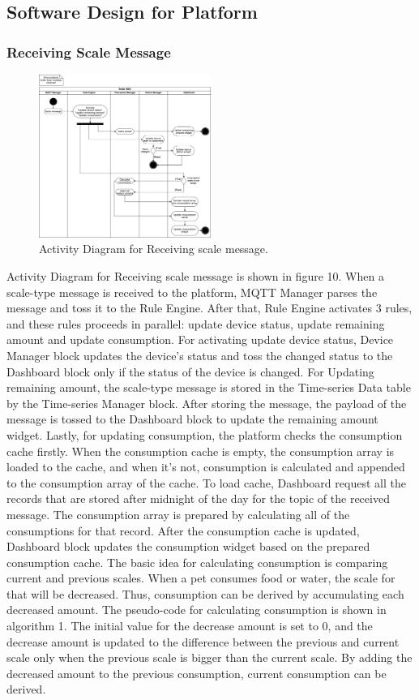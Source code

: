 \documentclass[conference]{IEEEtran}
\begin{document}
\subsection{Software Design for Platform}
\subsubsection{Receiving Scale Message}
\begin{figure}[htbp]
\centerline{\includegraphics[width=0.5\textwidth]{./images/scaleMessageReceived.png}}
\caption{Activity Diagram for Receiving scale message.}
\label{fig}
\end{figure}

Activity Diagram for Receiving scale message is shown in figure 10. When a scale-type message is received to the platform, MQTT Manager parses the message and toss it to the Rule Engine. After that, Rule Engine activates 3 rules, and these rules proceeds in parallel: update device status, update remaining amount and update consumption. For activating update device status, Device Manager block updates the device’s status and toss the changed status to the Dashboard block only if the status of the device is changed. For Updating remaining amount, the scale-type message is stored in the Time-series Data table by the Time-series Manager block. After storing the message, the payload of the message is tossed to the Dashboard block to update the remaining amount widget.
Lastly, for updating consumption, the platform checks the consumption cache firstly. When the consumption cache is empty, the consumption array is loaded to the cache, and when it’s not, consumption is calculated and appended to the consumption array of the cache. To load cache, Dashboard request all the records that are stored after midnight of the day for the topic of the received message. The consumption array is prepared by calculating all of the consumptions for that record. After the consumption cache is updated, Dashboard block updates the consumption widget based on the prepared consumption cache.
The basic idea for calculating consumption is comparing current and previous scales. When a pet consumes food or water, the scale for that will be decreased. Thus, consumption can be derived by accumulating each decreased amount. The pseudo-code for calculating consumption is shown in algorithm 1. The initial value for the decrease amount is set to 0, and the decrease amount is updated to the difference between the previous and current scale only when the previous scale is bigger than the current scale. By adding the decreased amount to the previous consumption, current consumption can be derived.
\end{document}
